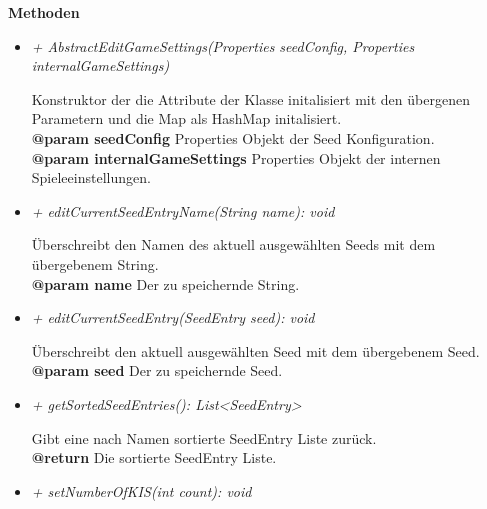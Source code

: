             \textbf{Methoden}					
            \begin{itemize}
                \item  \textit{+ AbstractEditGameSettings(Properties seedConfig, Properties internalGameSettings)} 
                    \begin{leftbar}[0.9\linewidth]
                        Konstruktor der die Attribute der Klasse initalisiert mit den
                        übergenen Parametern und die Map als HashMap initalisiert.\\
                        \textbf{@param seedConfig} Properties Objekt der Seed 
                        Konfiguration.\\
                        \textbf{@param internalGameSettings} Properties Objekt der 
                        internen Spieleeinstellungen.
                    \end{leftbar}
                \pagebreak
                \item  \textit{+ editCurrentSeedEntryName(String name): void} 
                    \begin{leftbar}[0.9\linewidth]
                        Überschreibt den Namen des aktuell ausgewählten
                        Seeds mit dem übergebenem String.\\
                        \textbf{@param name} Der zu speichernde String.\\
                    \end{leftbar}
                \item  \textit{+ editCurrentSeedEntry(SeedEntry seed): void} 
                    \begin{leftbar}[0.9\linewidth]
                        Überschreibt den aktuell ausgewählten Seed mit dem
                        übergebenem Seed.\\
                        \textbf{@param seed} Der zu speichernde Seed.\\
                    \end{leftbar}
                \item  \textit{+ getSortedSeedEntries(): List<SeedEntry>}
                    \begin{leftbar}[0.9\linewidth]
                        Gibt eine nach Namen sortierte SeedEntry Liste zurück.\\
                        \textbf{@return} Die sortierte SeedEntry Liste.
                    \end{leftbar}
                \item  \textit{+ setNumberOfKIS(int count): void} 

\end{itemize}
